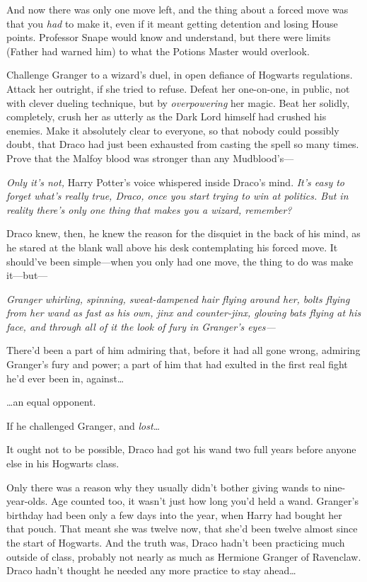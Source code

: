 And now there was only one move left, and the thing about a forced move was that you \emph{had} to make it, even if it meant getting detention and losing House points. Professor Snape would know and understand, but there were limits (Father had warned him) to what the Potions Master would overlook.

Challenge Granger to a wizard's duel, in open defiance of Hogwarts regulations. Attack her outright, if she tried to refuse. Defeat her one-on-one, in public, not with clever dueling technique, but by \emph{overpowering} her magic. Beat her solidly, completely, crush her as utterly as the Dark Lord himself had crushed his enemies. Make it absolutely clear to everyone, so that nobody could possibly doubt, that Draco had just been exhausted from casting the spell so many times. Prove that the Malfoy blood was stronger than any Mudblood's—

\emph{Only it's not,} Harry Potter's voice whispered inside Draco's mind. \emph{It's easy to forget what's really true, Draco, once you start trying to win at politics. But in reality there's only one thing that makes you a wizard, remember?}

Draco knew, then, he knew the reason for the disquiet in the back of his mind, as he stared at the blank wall above his desk contemplating his forced move. It should've been simple—when you only had one move, the thing to do was make it—but—

\emph{Granger whirling, spinning, sweat-dampened hair flying around her, bolts flying from her wand as fast as his own, jinx and counter-jinx, glowing bats flying at his face, and through all of it the look of fury in Granger's eyes—}

There'd been a part of him admiring that, before it had all gone wrong, admiring Granger's fury and power; a part of him that had exulted in the first real fight he'd ever been in, against{\ldots}

{\ldots}an equal opponent.

If he challenged Granger, and \emph{lost{\ldots}}

It ought not to be possible, Draco had got his wand two full years before anyone else in his Hogwarts class.

Only there was a reason why they usually didn't bother giving wands to nine-year-olds. Age counted too, it wasn't just how long you'd held a wand. Granger's birthday had been only a few days into the year, when Harry had bought her that pouch. That meant she was twelve now, that she'd been twelve almost since the start of Hogwarts. And the truth was, Draco hadn't been practicing much outside of class, probably not nearly as much as Hermione Granger of Ravenclaw. Draco hadn't thought he needed any more practice to stay ahead{\ldots}

